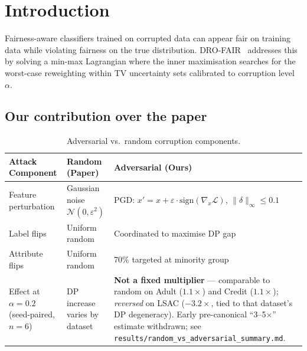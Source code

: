 \documentclass[11pt,a4paper]{article}
\begin{document}
\tableofcontents
\vspace{0.5cm}

\section{Introduction}

Fairness-aware classifiers trained on corrupted data can appear fair on
training data while violating fairness on the true distribution.
DRO-FAIR~\citep{drofair2026} addresses this by solving a min-max Lagrangian
where the inner maximisation searches for the worst-case reweighting within
TV uncertainty sets calibrated to corruption level $\alpha$.

\subsection*{Our contribution over the paper}

\begin{table}[h]
\centering\small
\caption{Adversarial vs.\ random corruption components.}
\label{tab:adversarial_compare}
\begin{tabular}{L{4cm}L{5cm}L{6cm}}
\toprule
{}
\color{white}\textbf{Attack Component} &
\color{white}\textbf{Random (Paper)} &
\color{white}\textbf{Adversarial (Ours)} \\
\midrule
Feature perturbation & Gaussian noise $\mathcal{N}(0,\varepsilon^2)$ &
  PGD: $x' = x + \varepsilon\cdot\mathrm{sign}(\nabla_x\mathcal{L})$,\; $\|\delta\|_\infty \le 0.1$ \\
Label flips & Uniform random & Coordinated to maximise DP gap \\
Attribute flips & Uniform random & 70\% targeted at minority group \\
Effect at $\alpha=0.2$ (seed-paired, $n{=}6$) &
  DP increase varies by dataset &
  \textbf{Not a fixed multiplier} --- comparable to random on Adult
  ($1.1\times$) and Credit ($1.1\times$); \emph{reversed} on LSAC
  ($-3.2\times$, tied to that dataset's DP degeneracy). Early
  pre-canonical ``3--5$\times$'' estimate withdrawn; see
  \texttt{results/random\_vs\_adversarial\_summary.md}. \\
\bottomrule
\end{tabular}
\end{table}
\end{document}
